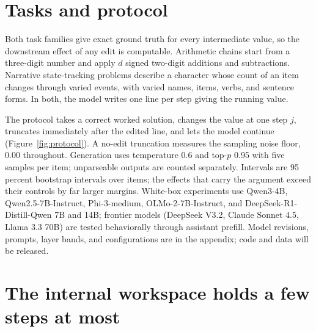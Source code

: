 \documentclass{article}
\begin{document}
\section{Tasks and protocol}

Both task families give exact ground truth for every intermediate value, so the downstream effect of any edit is computable. Arithmetic chains start from a three-digit number and apply $d$ signed two-digit additions and subtractions. Narrative state-tracking problems describe a character whose count of an item changes through varied events, with varied names, items, verbs, and sentence forms. In both, the model writes one line per step giving the running value.

The protocol takes a correct worked solution, changes the value at one step $j$, truncates immediately after the edited line, and lets the model continue (Figure~\ref{fig:protocol}). A no-edit truncation measures the sampling noise floor, 0.00 throughout. Generation uses temperature 0.6 and top-$p$ 0.95 with five samples per item; unparseable outputs are counted separately. Intervals are 95 percent bootstrap intervals over items; the effects that carry the argument exceed their controls by far larger margins. White-box experiments use Qwen3-4B, Qwen2.5-7B-Instruct, Phi-3-medium, OLMo-2-7B-Instruct, and DeepSeek-R1-Distill-Qwen 7B and 14B; frontier models (DeepSeek V3.2, Claude Sonnet 4.5, Llama 3.3 70B) are tested behaviorally through assistant prefill. Model revisions, prompts, layer bands, and configurations are in the appendix; code and data will be released.

\section{The internal workspace holds a few steps at most}
\label{sec:nohome}
\end{document}
